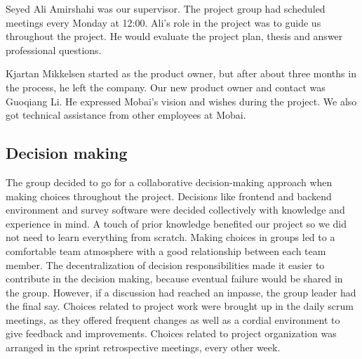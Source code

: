 Seyed Ali Amirshahi was our supervisor. The project group had scheduled meetings every Monday at 12:00. Ali's role in the project was to guide us throughout the project. He would evaluate the project plan, thesis and answer professional questions. 

Kjartan Mikkelsen started as the product owner, but after about three months in the process, he left the company. Our new product owner and contact was Guoqiang Li. He expressed Mobai's vision and wishes during the project. We also got technical assistance from other employees at Mobai. 

\subsection{Decision making}
The group decided to go for a collaborative decision-making \cite{GroupDecisionMaking} approach when making choices throughout the project. Decisions like frontend and backend environment and survey software were decided collectively with knowledge and experience in mind. A touch of prior knowledge benefited our project so we did not need to learn everything from scratch. Making choices in groups led to a comfortable team atmosphere with a good relationship between each team member. The decentralization of decision responsibilities made it easier to contribute in the decision making, because eventual failure would be shared in the group. However, if a discussion had reached an impasse, the group leader had the final say. Choices related to project work were brought up in the daily scrum meetings, as they offered frequent changes as well as a cordial environment to give feedback and improvements. Choices related to project organization was arranged in the sprint retrospective meetings, every other week. 


